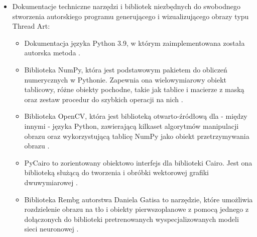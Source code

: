 \begin{itemize}
\begin{itemize}
        \end{itemize}
        \item Dokumentacje techniczne narzędzi i bibliotek niezbędnych do swobodnego stworzenia autorskiego programu generującego i wizualizującego obrazy typu Thread Art:
        \begin{itemize}
            \item Dokumentacja języka Python 3.9, w którym zaimplementowana została autorska metoda \cite{python39}.
            \item Biblioteka NumPy, która jest podstawowym pakietem do obliczeń numerycznych w Pythonie. Zapewnia ona wielowymiarowy obiekt tablicowy, różne obiekty pochodne, takie jak tablice i macierze z maską oraz zestaw procedur do szybkich operacji na nich \cite{numpy}.
            \item Biblioteka OpenCV, która jest biblioteką otwarto-źródłową dla - między innymi - języka Python, zawierającą kilkaset algorytmów manipulacji obrazu oraz wykorzystującą tablicę NumPy jako obiekt przetrzymywania obrazu \cite{opencv}.
            \item PyCairo to zorientowany obiektowo interfejs dla biblioteki Cairo. Jest ona biblioteką służącą do tworzenia i obróbki wektorowej grafiki dwuwymiarowej \cite{pycairo}.
            \item Biblioteka Rembg autorstwa Daniela Gatisa to narzędzie, które umożliwia rozdzielenie obrazu na tło i obiekty pierwszoplanowe z pomocą jednego z dołączonych do biblioteki pretrenowanych wyspecjalizowanych modeli sieci neuronowej \cite{rembg}.
        \end{itemize}
    \end{itemize}
    
